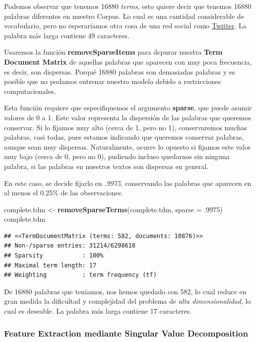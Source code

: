\documentclass[]{article}
\newenvironment{Shaded}{\begin{snugshade}}{\end{snugshade}}
\newcommand{\DataTypeTok}[1]{\textcolor[rgb]{0.13,0.29,0.53}{#1}}
\newcommand{\FloatTok}[1]{\textcolor[rgb]{0.00,0.00,0.81}{#1}}
\newcommand{\KeywordTok}[1]{\textcolor[rgb]{0.13,0.29,0.53}{\textbf{#1}}}
\newcommand{\NormalTok}[1]{#1}
\newcommand{\StringTok}[1]{\textcolor[rgb]{0.31,0.60,0.02}{#1}}
\begin{document}
Podemos observar que tenemos 16880 \emph{terms}, esto quiere decir que
tenemos 16880 palabras diferentes en nuestro Corpus. Lo cual es una
cantidad considerable de vocabulario, pero no esperaríamos otra cosa de
una red social como \href{https://twitter.com}{Twitter}. La palabra más
larga contiene 49 caracteres.

Usaremos la función \textbf{removeSparseItems} para depurar nuestra
\textbf{Term Document Matrix} de aquellas palabras que aparecen con muy
poca frecuencia, es decir, son dispersas. Porqué 16880 palabras son
demasiadas palabras y es posible que no podamos entrenar nuestro modelo
debido a restricciones computacionales.

Esta función requiere que especifiquemos el argumento \textbf{sparse},
que puede asumir valores de 0 a 1. Este valor representa la dispersión
de las palabras que queremos conservar. Si lo fijamos muy alto (cerca de
1, pero no 1), conservaremos muchas palabras, casi todas, pues estamos
indicando que queremos conservar palabras, aunque sean muy dispersas.
Naturalmente, ocurre lo opuesto si fijamos este valor muy bajo (cerca de
0, pero no 0), pudiendo incluso quedarnos sin ninguna palabra, si las
palabras en nuestros textos son dispersas en general.

En este caso, se decide fijarlo en \emph{.9975}, conservando las
palabras que aparecen en al menos el 0.25\% de las observaciones.

\begin{Shaded}
\begin{Highlighting}[]
\NormalTok{complete.tdm <-}\StringTok{ }\KeywordTok{removeSparseTerms}\NormalTok{(complete.tdm, }\DataTypeTok{sparse =} \FloatTok{.9975}\NormalTok{)}
\NormalTok{complete.tdm}
\end{Highlighting}
\end{Shaded}

\begin{verbatim}
## <<TermDocumentMatrix (terms: 582, documents: 10876)>>
## Non-/sparse entries: 31214/6298618
## Sparsity           : 100%
## Maximal term length: 17
## Weighting          : term frequency (tf)
\end{verbatim}

De 16880 palabras que teníamos, nos hemos quedado con 582, lo cual
reduce en gran medida la dificultad y complejidad del problema de
\emph{alta dimensionalidad}, lo cual es deseable. La palabra más larga
contiene 17 caracteres.

\hypertarget{feature-extraction-mediante-singular-value-decomposition}{%
\subsubsection{Feature Extraction mediante Singular Value
Decomposition}\label{feature-extraction-mediante-singular-value-decomposition}}
\end{document}
